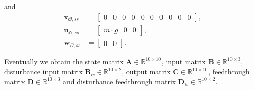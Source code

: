 and
\begin{align}
\mathbf{x}_{\mathcal{O},ss} &= \begin{bmatrix}
0 & 0 & 0 & 0 & 0 & 0 & 0 & 0 & 0 & 0
\end{bmatrix} ,\\
\mathbf{u}_{\mathcal{O},ss} &= \begin{bmatrix}
m \cdot g & 0 & 0
\end{bmatrix} ,\\ 
\mathbf{w}_{\mathcal{O},ss} &= \begin{bmatrix}
0 & 0 
\end{bmatrix}.
\end{align}

Eventually we obtain the state matrix $\mathbf{A} \in \mathbb{R}^{10\times10}$, input matrix $\mathbf{B} \in \mathbb{R}^{10\times3}$, disturbance input matrix $\mathbf{B}_w \in \mathbb{R}^{10\times2}$, output matrix $\mathbf{C} \in \mathbb{R}^{10\times10}$,  feedthrough matrix $\mathbf{D} \in \mathbb{R}^{10\times3}$ and disturbance feedthrough matrix  $\mathbf{D}_w \in \mathbb{R}^{10\times2}$. 

